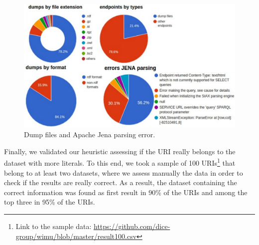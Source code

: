 \begin{figure}[htp] 
	\centering
	\includegraphics[width=340pt]{img/dumps3.pdf}
	\caption{Dump files and Apache Jena parsing error.}
	\label{fig:dumps}
\end{figure}

Finally, we validated our heuristic assessing if the URI really belongs to the dataset with more literals.
To this end, we took a sample of 100 URIs\footnote{Link to the sample data: \url{https://github.com/dice-group/wimu/blob/master/result100.csv}} that belong to at least two datasets, where we assess manually the data in order to check if the results are really correct. 
As a result, the dataset containing the correct information was found as first result in 90\% of the URIs and among the top three in 95\% of the URIs.


